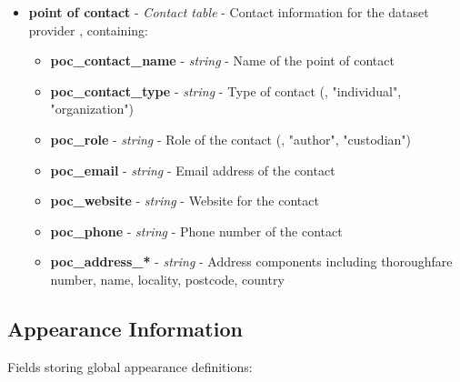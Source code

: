 \begin{itemize}
  \item \textbf{point of contact} - \textit{Contact table} - Contact information for the dataset provider \citep{cityjson_spec}, containing:
    \begin{itemize}
      \item \textbf{poc\_contact\_name} - \textit{string} - Name of the point of contact
      \item \textbf{poc\_contact\_type} - \textit{string} - Type of contact (\eg, "individual", "organization")
      \item \textbf{poc\_role} - \textit{string} - Role of the contact (\eg, "author", "custodian")
      \item \textbf{poc\_email} - \textit{string} - Email address of the contact
      \item \textbf{poc\_website} - \textit{string} - Website for the contact
      \item \textbf{poc\_phone} - \textit{string} - Phone number of the contact
      \item \textbf{poc\_address\_*} - \textit{string} - Address components including thoroughfare number, name, locality, postcode, country
    \end{itemize}
\end{itemize}

\subsection{Appearance Information}
\label{methodology:header:appearance}

Fields storing global appearance definitions:


